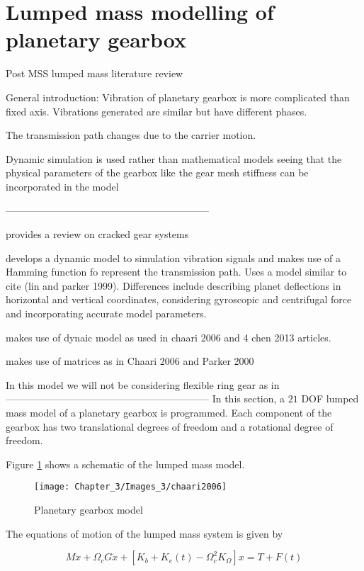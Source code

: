 \section{Lumped mass modelling of planetary gearbox}
Post MSS lumped mass literature review


General introduction:
Vibration of planetary gearbox is more complicated than fixed axis. Vibrations generated are similar but have different phases. 

The transmission path changes due to the carrier motion.

Dynamic simulation is used rather than mathematical models seeing that the physical parameters of the gearbox like the gear mesh stiffness can be incorporated in the model \cite{Liang2015}

--------------------------------------------------------------

\cite{Ma2015} provides a review on cracked gear systems

\cite{Liang2015} develops a dynamic model to simulation vibration signals and makes use of a Hamming function fo represent the transmission path. Uses a model similar to cite (lin and parker 1999). Differences include describing planet deflections in horizontal and vertical coordinates, considering gyroscopic and centrifugal force and incorporating accurate model parameters.

\cite{Chen 2015} makes use of dynaic model as used in chaari 2006  and 4 chen 2013 articles.

\cite{Chen2013} makes use of matrices as in Chaari 2006 and Parker 2000

In this model we will not be considering flexible ring gear as in \cite{Chen2015}
--------------------------------------------------------------
In this section, a $21$ DOF lumped mass model of a planetary gearbox \citep{Chaari2006} is programmed. Each component of the gearbox has two translational degrees of freedom and a rotational degree of freedom.

Figure \ref{F:model} shows a schematic of the lumped mass model. 

\begin{figure}[H]
	\centering
	\texttt{[image: Chapter\_3/Images\_3/chaari2006]}
	\caption{Planetary gearbox model \citep{Chaari2006}}
	\label{F:model}
\end{figure}

The equations of motion of the lumped mass system is given by 

\begin{equation}
M \ddot{x}+\Omega_{c} G \dot{x}+\left[K_{b}+K_{e}(t)-\Omega_{c}^{2} K_{\Omega}\right] x=T+F(t)
\end{equation}

